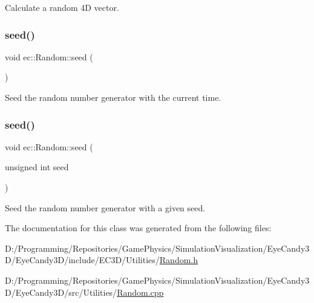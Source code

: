 Calculate a random 4D vector. \mbox{\label{classec_1_1_random_a3e4ad02afb2979b3549fbd70e6f71412}} 
\subsubsection{\texorpdfstring{seed()}{seed()}\hspace{0.1cm}{\footnotesize\ttfamily [1/2]}}
{\footnotesize\ttfamily void ec\+::\+Random\+::seed (\begin{DoxyParamCaption}{ }\end{DoxyParamCaption})\hspace{0.3cm}{\ttfamily [static]}}

Seed the random number generator with the current time. \mbox{\label{classec_1_1_random_aa2b21cb97b3a7c36e89b8afda6ca500d}} 
\subsubsection{\texorpdfstring{seed()}{seed()}\hspace{0.1cm}{\footnotesize\ttfamily [2/2]}}
{\footnotesize\ttfamily void ec\+::\+Random\+::seed (\begin{DoxyParamCaption}\item[{unsigned int}]{seed }\end{DoxyParamCaption})\hspace{0.3cm}{\ttfamily [static]}}

Seed the random number generator with a given seed. 

The documentation for this class was generated from the following files\+:\begin{DoxyCompactItemize}
\item 
D\+:/\+Programming/\+Repositories/\+Game\+Physics/\+Simulation\+Visualization/\+Eye\+Candy3\+D/\+Eye\+Candy3\+D/include/\+E\+C3\+D/\+Utilities/\mbox{\hyperlink{_random_8h}{Random.\+h}}\item 
D\+:/\+Programming/\+Repositories/\+Game\+Physics/\+Simulation\+Visualization/\+Eye\+Candy3\+D/\+Eye\+Candy3\+D/src/\+Utilities/\mbox{\hyperlink{_random_8cpp}{Random.\+cpp}}\end{DoxyCompactItemize}
